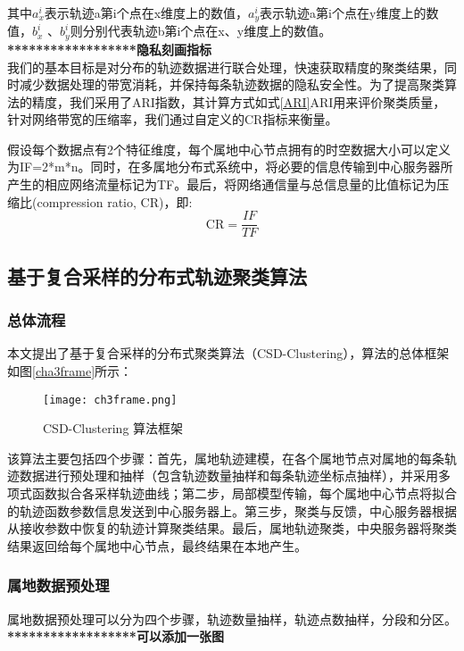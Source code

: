 其中$a_x^i$表示轨迹a第i个点在x维度上的数值，$a_y^i$表示轨迹a第i个点在y维度上的数值，$b_x^i$ 、$b_y^i$则分别代表轨迹b第i个点在x、y维度上的数值。	\\
\textbf{******************隐私刻画指标}\\
我们的基本目标是对分布的轨迹数据进行联合处理，快速获取精度的聚类结果，同时减少数据处理的带宽消耗，并保持每条轨迹数据的隐私安全性。为了提高聚类算法的精度，我们采用了ARI指数，其计算方式如式\ref{ARI}ARI用来评价聚类质量，针对网络带宽的压缩率，我们通过自定义的CR指标来衡量。

假设每个数据点有2个特征维度，每个属地中心节点拥有的时空数据大小可以定义为IF=2*m*n。同时，在多属地分布式系统中，将必要的信息传输到中心服务器所产生的相应网络流量标记为TF。最后，将网络通信量与总信息量的比值标记为压缩比(compression ratio, CR)，即:
\begin{equation}
\label{CR}
\mathrm{CR}=\frac{I F}{T F}
\end{equation}


\subsection{基于复合采样的分布式轨迹聚类算法}

\subsubsection{总体流程}
本文提出了基于复合采样的分布式聚类算法（CSD-Clustering），算法的总体框架如图\ref{cha3frame}所示：
\begin{figure}[h]
	\texttt{[image: ch3frame.png]}
	\caption{CSD-Clustering 算法框架}
	\label{ch3frame}
\end{figure}

该算法主要包括四个步骤：首先，属地轨迹建模，在各个属地节点对属地的每条轨迹数据进行预处理和抽样（包含轨迹数量抽样和每条轨迹坐标点抽样），并采用多项式函数拟合各采样轨迹曲线；第二步，局部模型传输，每个属地中心节点将拟合的轨迹函数参数信息发送到中心服务器上。第三步，聚类与反馈，中心服务器根据从接收参数中恢复的轨迹计算聚类结果。最后，属地轨迹聚类，中央服务器将聚类结果返回给每个属地中心节点，最终结果在本地产生。 

\subsubsection{属地数据预处理}
属地数据预处理可以分为四个步骤，轨迹数量抽样，轨迹点数抽样，分段和分区。
\textbf{******************可以添加一张图 }

